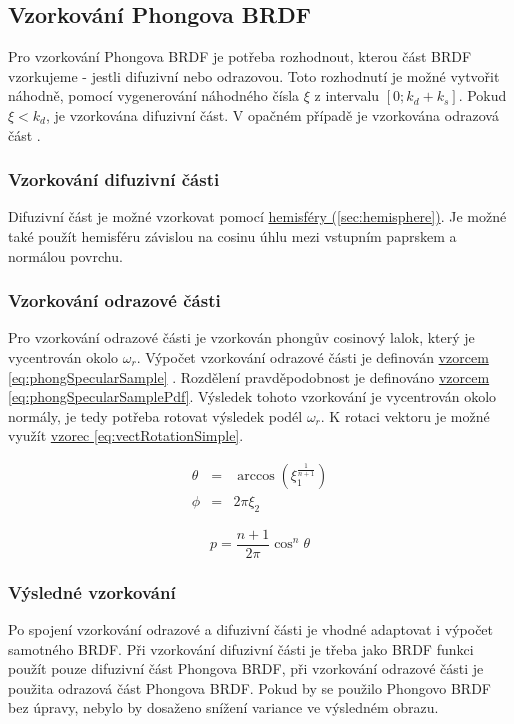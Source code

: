 \documentclass[czech,master,dept460,male,cpp,cpdeclaration]{diploma}
\newcommand{\interval}[1]{\left[{#1}\right]}
\newcommand{\refl}{\omega_{r}}
\newcommand{\randU}{\xi_{1}}
\newcommand{\randV}{\xi_{2}}
\begin{document}
\subsection{Vzorkování Phongova BRDF} \label{sec:phongSampling}
Pro vzorkování Phongova BRDF je potřeba rozhodnout, kterou část BRDF vzorkujeme - jestli difuzivní nebo odrazovou. Toto rozhodnutí je možné vytvořit náhodně, pomocí vygenerování náhodného čísla $\xi$ z intervalu $\interval{0;k_d+k_s}$. Pokud $\xi < k_d$, je vzorkována difuzivní část. V opačném případě je vzorkována odrazová část \cite{KrivanekBRDFIBL}.
\subsubsection{Vzorkování difuzivní části}
Difuzivní část je možné vzorkovat pomocí \hyperref[sec:hemisphere]{hemisféry (\ref{sec:hemisphere})}. Je možné také použít hemisféru závislou na cosinu úhlu mezi vstupním paprskem a normálou povrchu.

\subsubsection{Vzorkování odrazové části}
Pro vzorkování odrazové části je vzorkován phongův cosinový lalok, který je vycentrován okolo $\refl$. Výpočet vzorkování odrazové části je definován \hyperref[eq:phongSpecularSample]{vzorcem \ref{eq:phongSpecularSample}} \cite{KrivanekBRDFIBL}. Rozdělení pravděpodobnost je definováno \hyperref[eq:phongSpecularSamplePdf]{vzorcem \ref{eq:phongSpecularSamplePdf}}.
Výsledek tohoto vzorkování je vycentrován okolo normály, je tedy potřeba rotovat výsledek podél $\refl$. K rotaci vektoru je možné využít \hyperref[eq:vectRotationSimple]{vzorec \ref{eq:vectRotationSimple}}.

\begin{eqnarray}
    \theta & = & \arccos(\randU^{\frac{1}{n+1}}) \nonumber \\
    \phi & = & 2\pi\randV\label{eq:phongSpecularSample}
\end{eqnarray}

\begin{equation} \label{eq:phongSpecularSamplePdf}
    p = \frac{n+1}{2\pi}\cos^n\theta
\end{equation}

\subsubsection{Výsledné vzorkování}
Po spojení vzorkování odrazové a difuzivní části je vhodné adaptovat i výpočet samotného BRDF. Při vzorkování difuzivní části je třeba jako BRDF funkci použít pouze difuzivní část Phongova BRDF, při vzorkování odrazové části je použita odrazová část Phongova BRDF. Pokud by se použilo Phongovo BRDF bez úpravy, nebylo by dosaženo snížení variance ve výsledném obrazu. \cite{KrivanekBRDFIBL}
\end{document}
